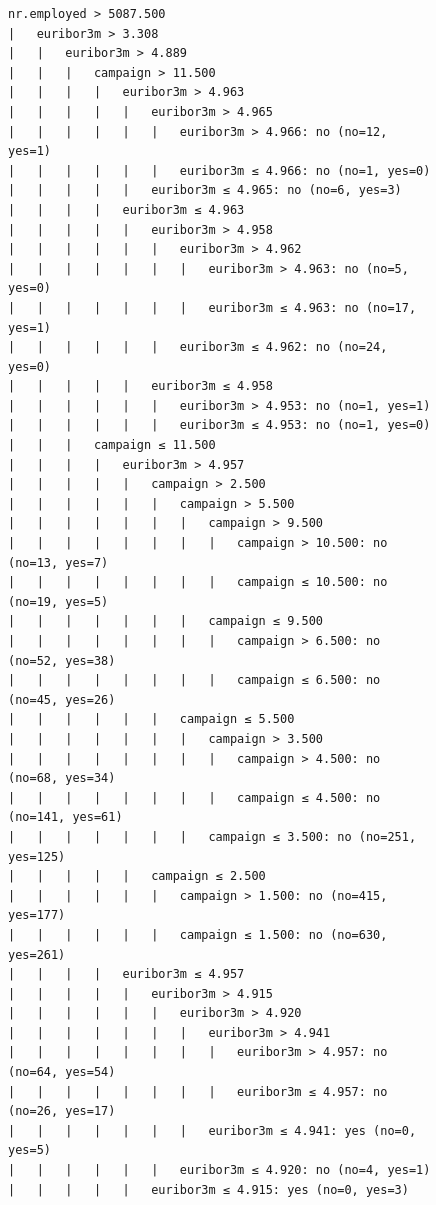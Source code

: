 \documentclass[prodmode]{acmsmall} %
\begin{document}
\begin{figure}[!t]
    \begin{verbatim}
nr.employed > 5087.500
|   euribor3m > 3.308
|   |   euribor3m > 4.889
|   |   |   campaign > 11.500
|   |   |   |   euribor3m > 4.963
|   |   |   |   |   euribor3m > 4.965
|   |   |   |   |   |   euribor3m > 4.966: no (no=12, yes=1)
|   |   |   |   |   |   euribor3m ≤ 4.966: no (no=1, yes=0)
|   |   |   |   |   euribor3m ≤ 4.965: no (no=6, yes=3)
|   |   |   |   euribor3m ≤ 4.963
|   |   |   |   |   euribor3m > 4.958
|   |   |   |   |   |   euribor3m > 4.962
|   |   |   |   |   |   |   euribor3m > 4.963: no (no=5, yes=0)
|   |   |   |   |   |   |   euribor3m ≤ 4.963: no (no=17, yes=1)
|   |   |   |   |   |   euribor3m ≤ 4.962: no (no=24, yes=0)
|   |   |   |   |   euribor3m ≤ 4.958
|   |   |   |   |   |   euribor3m > 4.953: no (no=1, yes=1)
|   |   |   |   |   |   euribor3m ≤ 4.953: no (no=1, yes=0)
|   |   |   campaign ≤ 11.500
|   |   |   |   euribor3m > 4.957
|   |   |   |   |   campaign > 2.500
|   |   |   |   |   |   campaign > 5.500
|   |   |   |   |   |   |   campaign > 9.500
|   |   |   |   |   |   |   |   campaign > 10.500: no (no=13, yes=7)
|   |   |   |   |   |   |   |   campaign ≤ 10.500: no (no=19, yes=5)
|   |   |   |   |   |   |   campaign ≤ 9.500
|   |   |   |   |   |   |   |   campaign > 6.500: no (no=52, yes=38)
|   |   |   |   |   |   |   |   campaign ≤ 6.500: no (no=45, yes=26)
|   |   |   |   |   |   campaign ≤ 5.500
|   |   |   |   |   |   |   campaign > 3.500
|   |   |   |   |   |   |   |   campaign > 4.500: no (no=68, yes=34)
|   |   |   |   |   |   |   |   campaign ≤ 4.500: no (no=141, yes=61)
|   |   |   |   |   |   |   campaign ≤ 3.500: no (no=251, yes=125)
|   |   |   |   |   campaign ≤ 2.500
|   |   |   |   |   |   campaign > 1.500: no (no=415, yes=177)
|   |   |   |   |   |   campaign ≤ 1.500: no (no=630, yes=261)
|   |   |   |   euribor3m ≤ 4.957
|   |   |   |   |   euribor3m > 4.915
|   |   |   |   |   |   euribor3m > 4.920
|   |   |   |   |   |   |   euribor3m > 4.941
|   |   |   |   |   |   |   |   euribor3m > 4.957: no (no=64, yes=54)
|   |   |   |   |   |   |   |   euribor3m ≤ 4.957: no (no=26, yes=17)
|   |   |   |   |   |   |   euribor3m ≤ 4.941: yes (no=0, yes=5)
|   |   |   |   |   |   euribor3m ≤ 4.920: no (no=4, yes=1)
|   |   |   |   |   euribor3m ≤ 4.915: yes (no=0, yes=3)
\end{verbatim}
\end{figure}
\end{document}
